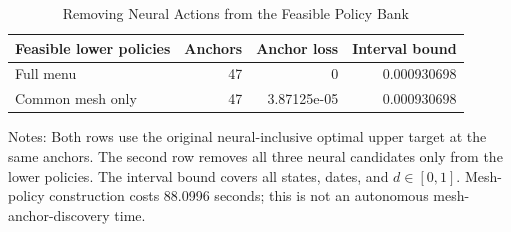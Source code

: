 \begin{table}[!htbp]
\centering\small
\caption{Removing Neural Actions from the Feasible Policy Bank}
\label{tab:r6_mesh}
\begin{tabular}{lrrr}
\toprule
Feasible lower policies & Anchors & Anchor loss & Interval bound \\
\midrule
Full menu & 47 & 0 & 0.000930698 \\
Common mesh only & 47 & 3.87125e-05 & 0.000930698 \\
\bottomrule
\end{tabular}
\par\smallskip
\begin{minipage}{0.98\linewidth}\footnotesize
Notes: Both rows use the original neural-inclusive optimal upper target at the same anchors. The second row removes all three neural candidates only from the lower policies. The interval bound covers all states, dates, and $d\in[0,1]$. Mesh-policy construction costs 88.0996 seconds; this is not an autonomous mesh-anchor-discovery time.
\end{minipage}
\end{table}
